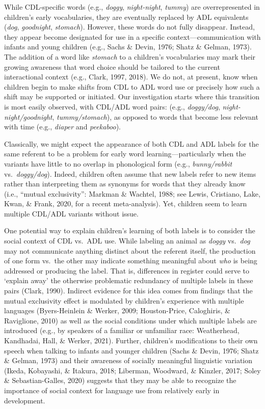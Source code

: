 \documentclass[10pt, letterpaper]{article}
\begin{document}
While CDL-specific words (e.g., \emph{doggy}, \emph{night-night},
\emph{tummy}) are overrepresented in children's early vocabularies, they
are eventually replaced by ADL equivalents (\emph{dog},
\emph{goodnight}, \emph{stomach}). However, these words do not fully
disappear. Instead, they appear become designated for use in a specific
context---communication with infants and young children (e.g., Sachs \&
Devin, 1976; Shatz \& Gelman, 1973). The addition of a word like
\emph{stomach} to a children's vocabularies may mark their growing
awareness that word choice should be tailored to the current
interactional context (e.g., Clark, 1997, 2018). We do not, at present,
know when children begin to make shifts from CDL to ADL word use or
precisely how such a shift may be supported or initiated. Our
investigation starts where this transition is most easily observed, with
CDL/ADL word pairs: (e.g., \emph{doggy/dog},
\emph{night-night/goodnight}, \emph{tummy/stomach}), as opposed to words
that become less relevant with time (e.g., \emph{diaper} and
\emph{peekaboo}).

Classically, we might expect the appearance of both CDL and ADL labels
for the same referent to be a problem for early word
learning---particularly when the variants have little to no overlap in
phonological form (e.g., \emph{bunny/rabbit} vs.~\emph{doggy/dog}).
Indeed, children often assume that new labels refer to new items rather
than interpreting them as synonyms for words that they already know
(i.e., {``mutual exclusivity''}: Markman \& Wachtel, 1988; see Lewis,
Cristiano, Lake, Kwan, \& Frank, 2020, for a recent meta-analysis). Yet,
children seem to learn multiple CDL/ADL variants without issue.

One potential way to explain children's learning of both labels is to
consider the social context of CDL vs.~ADL use. While labeling an animal
as \emph{doggy} vs.~\emph{dog} may not communicate anything distinct
about the referent itself, the production of one form vs.~the other may
indicate something meaningful about \emph{who} is being addressed or
producing the label. That is, differences in register could serve to
`explain away' the otherwise problematic redundancy of multiple labels
in these pairs (Clark, 1990). Indirect evidence for this idea comes from
findings that the mutual exclusivity effect is modulated by children's
experience with multiple languages (Byers-Heinlein \& Werker, 2009;
Houston-Price, Caloghiris, \& Raviglione, 2010) as well as the social
conditions under which multiple labels are introduced (e.g., by speakers
of a familiar or unfamiliar race: Weatherhead, Kandhadai, Hall, \&
Werker, 2021). Further, children's modifications to their own speech
when talking to infants and younger children (Sachs \& Devin, 1976;
Shatz \& Gelman, 1973) and their awareness of socially meaningful
linguistic variation (Ikeda, Kobayashi, \& Itakura, 2018; Liberman,
Woodward, \& Kinzler, 2017; Soley \& Sebastian-Galles, 2020) suggests
that they may be able to recognize the importance of social context for
language use from relatively early in development.
\end{document}
